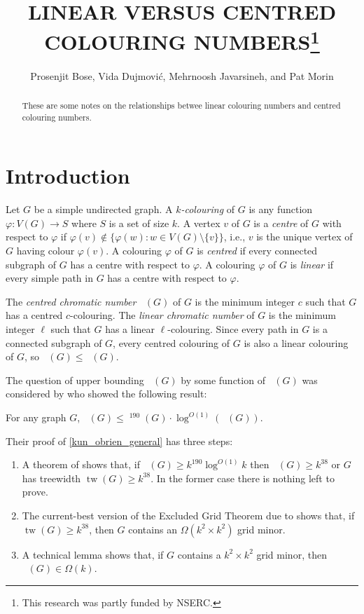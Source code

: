 \documentclass{patmorin}
\title{\MakeUppercase{Linear versus centred Colouring Numbers}\thanks{This research was partly funded by NSERC.}}
\author{Prosenjit Bose, Vida Dujmović, Mehrnoosh Javarsineh, and Pat Morin}
\date{}
\DeclareMathOperator{\tw}{tw}
\DeclareMathOperator{\chicen}{\chi_{\mathrm{cen}}}
\DeclareMathOperator{\chilin}{\chi_{\mathrm{lin}}}
\begin{document}
\maketitle

\begin{abstract}
    These are some notes on the relationships betwee linear colouring numbers and centred colouring numbers.
\end{abstract}

\section{Introduction}

Let $G$ be a simple undirected graph.  A \emph{$k$-colouring} of $G$ is any function $\varphi:V(G)\to S$ where $S$ is a set of size $k$.  A vertex $v$ of $G$ is a \emph{centre} of $G$ with respect to $\varphi$ if $\varphi(v)\not\in\{\varphi(w):w\in V(G)\setminus\{v\}\}$, i.e., $v$ is the unique vertex of $G$ having colour $\varphi(v)$.  A colouring $\varphi$ of $G$ is \emph{centred} if every connected subgraph of $G$ has a centre with respect to $\varphi$. A colouring $\varphi$ of $G$ is \emph{linear} if every simple path in $G$ has a centre with respect to $\varphi$.

The \emph{centred chromatic number} $\chicen(G)$ of $G$ is the minimum integer $c$ such that $G$ has a centred $c$-colouring.  The \emph{linear chromatic number} of $G$ is the minimum integer $\ell$ such that $G$ has a linear $\ell$-colouring.  Since every path in $G$ is a connected subgraph of $G$, every centred colouring of $G$ is also a linear colouring of $G$, so $\chilin(G)\le\chicen(G)$.

The question of upper bounding $\chicen(G)$ by some function of $\chilin(G)$ was considered by \citet[Theorem~1]{kun.obrien.ea:polynomial} who showed the following result:

\begin{thm}\label{kun_obrien_general}
  For any graph $G$, $\chicen(G)\le \chilin^{190}(G)\cdot\log^{O(1)}(\chilin(G))$.
\end{thm}


Their proof of \cref{kun_obrien_general} has three steps:
\begin{enumerate}
  \item A theorem of \citet{kawarabayashi.rossman:polynomial} shows that, if $\chicen(G)\ge k^{190}\log^{O(1)} k$ then $\chilin(G)\ge k^{38}$ or $G$ has treewidth $\tw(G)\ge k^{38}$.  In the former case there is nothing left to prove.
  \item The current-best version of the Excluded Grid Theorem due to \citet{chuzhoy:improved} shows that, if $\tw(G)\ge k^{38}$, then $G$ contains an $\Omega(k^2\times k^2)$ grid minor.
  \item A technical lemma \cite[Lemma~5]{kun.obrien.ea:polynomial} shows that, if $G$ contains a $k^2\times k^2$ grid minor, then $\chilin(G)\in\Omega(k)$.
\end{enumerate}
\end{document}
